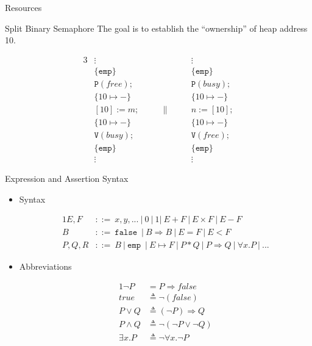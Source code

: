 \documentclass{beamer}
\newcommand{\mtt}[1]{
  \mathtt{#1}\;
}
\begin{document}
\begin{frame}{Resources}
  \begin{block}{Split Binary Semaphore}
    The goal is to establish the ``ownership'' of heap address 10.
  \end{block}

  \begin{example}
    \begin{alignat*}{3}
      & \vdots            && \vdots \\
      & \{\mathtt{emp}\}  && \{\mathtt{emp}\}  \\
      & \mathtt{P}(free); && \mathtt{P}(busy); \\
      & \{10 \mapsto -\}  && \{10 \mapsto -\}  \\
      & [10] := m; & \qquad \| \qquad & n := [10]; \\
      & \{10 \mapsto -\}  && \{10 \mapsto -\}  \\
      & \mathtt{V}(busy); && \mathtt{V}(free); \\
      & \{\mathtt{emp}\}  && \{\mathtt{emp}\}  \\
      & \vdots            && \vdots
    \end{alignat*}
  \end{example}
\end{frame}

\begin{frame}{Expression and Assertion Syntax}
  \begin{itemize}
    \item {
      Syntax

      \begin{alignat*}{1}
        E, F &::=\ x, y, ...\ |\ 0\ |\ 1 |\ E + F\ |\ E \times F\ |\ E - F \\
        B &::=\ \mtt{false}\ |\ B \Rightarrow B\ |\ E = F\ |\ E < F \\
        P, Q, R &::=\ B\ |\ \mtt{emp}\ |\ E \mapsto F\ |\ P * Q\ |\ P \Rightarrow Q\ |\ \forall x.P\ |\ ...
      \end{alignat*}
    }

    \item {
      Abbreviations

      \begin{alignat*}{1}
        \neg P &= P \Rightarrow false\\
        true &\triangleq \neg(false)\\
        P \lor Q &\triangleq (\neg P) \Rightarrow Q\\
        P \land Q &\triangleq \neg (\neg P \lor \neg Q)\\
        \exists x. P &\triangleq \neg \forall x.\neg P \\
      \end{alignat*}
    }
  \end{itemize}
\end{frame}
\end{document}
